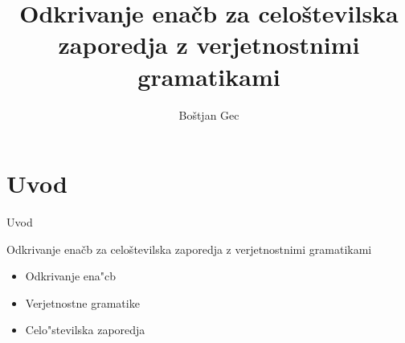 \documentclass[t,usenames,dvipsnames]{beamer} %
\title{Odkrivanje enačb za celoštevilska zaporedja z verjetnostnimi gramatikami}
\author{Boštjan Gec}
\institute{mentor: prof. dr. Ljupčo Todorovski}
\begin{document}
\begin{frame}
  \maketitle
\end{frame}


\section{Uvod}

\begin{frame}{Uvod}
	\begin{block}{Odkrivanje enačb za celoštevilska zaporedja z verjetnostnimi gramatikami}
	\begin{itemize}
		\item Odkrivanje ena"cb
		\item Verjetnostne gramatike
		\item Celo"stevilska zaporedja
	\end{itemize}
	\end{block}
\end{frame}


\end{document}
